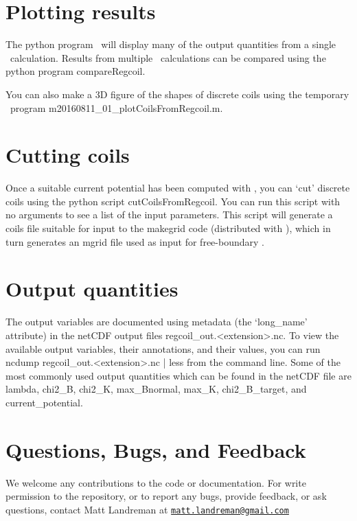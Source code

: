 \section{Plotting results}

The python program \regcoilPlot~will display many of the output quantities from a single \regcoil~calculation.
Results from multiple \regcoil~calculations can be compared using the python program {\ttfamily compareRegcoil}.

You can also make a 3D figure of the shapes of discrete coils using the temporary \matlab~program {\ttfamily m20160811\_01\_plotCoilsFromRegcoil.m}.

\section{Cutting coils}

Once a suitable current potential has been computed with \regcoil, you can `cut' discrete coils
using the python script {\ttfamily cutCoilsFromRegcoil}. You can run this script with no arguments
to see a list of the input parameters. This script will generate a coils file suitable for input to the
{\ttfamily makegrid} code (distributed with \vmec), which in turn generates an mgrid file used as input for free-boundary \vmec.

\section{Output quantities}

The output variables are documented using metadata (the `{\ttfamily long\_name}' attribute)
in the netCDF output files {\ttfamily regcoil\_out.<extension>.nc}.
To view the available output variables, their annotations, and their values, you can run
{\ttfamily ncdump regcoil\_out.<extension>.nc | less} from the command line.
Some of the most commonly used output quantities which can be found in the netCDF file are 
{\ttfamily lambda},
{\ttfamily chi2\_B},
{\ttfamily chi2\_K},
{\ttfamily max\_Bnormal},
{\ttfamily max\_K},
{\ttfamily chi2\_B\_target},
and
{\ttfamily current\_potential}.

\section{Questions, Bugs, and Feedback}

We welcome any contributions to the code or documentation.
For write permission to the repository, or to report any bugs, provide feedback, or ask questions, contact Matt Landreman at
\href{mailto:matt.landreman@gmail.com}{\nolinkurl{matt.landreman@gmail.com} }






